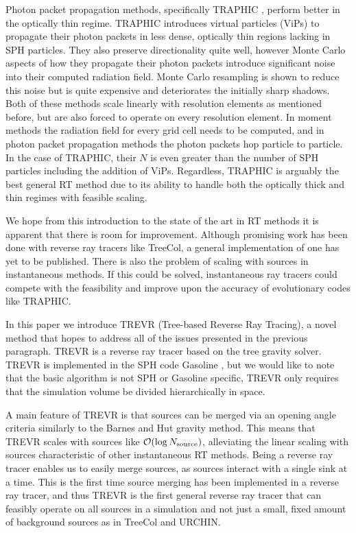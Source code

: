 \documentclass[fleqn,usenatbib]{mnras}
\newcommand{\acro}{TREVR}
\begin{document}
Photon packet propagation methods, specifically TRAPHIC \citep{pawlikSchaye08},
 perform better in the optically thin regime. TRAPHIC introduces virtual 
particles (ViPs) to propagate their photon packets in less dense, optically 
thin regions lacking in SPH particles. They also preserve directionality quite 
well, however Monte Carlo aspects of how they propagate their photon packets 
introduce significant noise into their computed radiation field. Monte Carlo
 resampling is shown to reduce this noise but is quite expensive and 
deteriorates the initially sharp shadows. Both of these methods scale linearly 
with resolution elements as mentioned before, but are also forced to operate on
 every resolution element. In moment methods the radiation field for every 
grid cell needs to be computed, and in photon packet propagation methods the 
photon packets hop particle to particle. In the case of TRAPHIC, their $N$ is 
even greater than the number of SPH particles including the addition of ViPs. 
Regardless, TRAPHIC is arguably the best general RT method due to its ability 
to handle both the optically thick and thin regimes with feasible scaling.

We hope from this introduction to the state of the art in RT methods it is 
apparent that there is room for improvement. Although promising work has been 
done with reverse ray tracers like TreeCol, a general implementation of one has
 yet to be published. There is also the problem of scaling with sources in 
instantaneous methods. If this could be solved, instantaneous ray tracers could
 compete with the feasibility and improve upon the accuracy of evolutionary
 codes like TRAPHIC.

In this paper we introduce \acro{} (Tree-based Reverse Ray Tracing), a novel 
method that hopes to address all of the issues presented in the previous 
paragraph. \acro{} is a reverse ray tracer based on the \cite{barnesHut86} tree
 gravity solver. \acro{} is implemented in the SPH code Gasoline 
\citep{wadsleyEt03}, but we would like to note that the basic algorithm is not
 SPH or Gasoline specific, \acro{} only requires that the simulation volume be 
divided hierarchically in space. 

A main feature of \acro{} is that sources can be merged via an opening  angle 
criteria similarly to the Barnes and Hut gravity method. This means that 
\acro{} scales with sources like $\mathcal{O}(\log N_{\rm source})$, 
alleviating the linear scaling with sources characteristic of other 
instantaneous RT methods. Being a reverse ray tracer enables us to easily merge
 sources, as sources interact with a single sink at a time. This is 
the first time source merging has been implemented in a reverse ray tracer, and
 thus \acro{} is the first general reverse ray tracer that can feasibly operate
 on all sources in a simulation and not just a small, fixed amount of 
background sources as in TreeCol and URCHIN.
\end{document}
